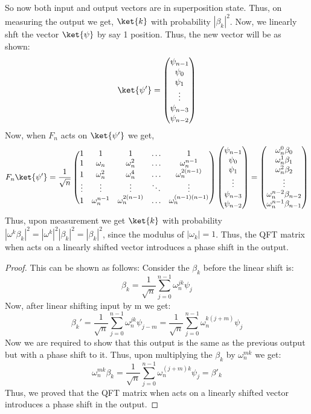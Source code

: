 \documentclass[12pt, oneside]{book}
\theoremstyle{definition}
\theoremstyle{definition}
\theoremstyle{remark}
\begin{document}
\begin{itemize}
        So now both input and output vectors are in superposition state. Thus, on measuring the output we get,
        $\ket{k}$ with probability $|\beta_k|^2$. Now, we linearly shft the vector $\ket{\psi}$ by say 1 position. Thus, the new vector will be as shown:
        \[ \ket{\psi'}=\begin{pmatrix} \psi_{n-1} \\ \psi_0 \\ \psi_1 \\ \vdots \\ \psi_{n-3} \\ \psi_{n-2} \end{pmatrix} \]
        Now, when $F_n$ acts on $\ket{\psi'}$ we get,
        \[ F_n\ket{\psi'}=\dfrac{1}{\sqrt{n}}\begin{pmatrix} 1 & 1 & 1 & \ldots & 1 \\ 1 & \omega_n & \omega_n^2 & \ldots & \omega_n^{n-1} \\ 1 & \omega_n^2 & \omega_n^4 & \ldots & \omega_n^{2(n-1)} \\ \vdots & \vdots & \vdots & \ddots & \vdots \\ 1 & \omega_n^{n-1} & \omega_n^{2(n-1)} & \ldots & \omega_n^{(n-1)(n-1)} \end{pmatrix}\begin{pmatrix} \psi_{n-1} \\ \psi_0 \\ \psi_1 \\ \vdots \\ \psi_{n-3} \\ \psi_{n-2} \end{pmatrix}=\begin{pmatrix} \omega_n^0 \beta_0 \\ \omega_n^1 \beta_1 \\ \omega_n^2 \beta_2 \\ \vdots \\ \omega_n^{n-2}\beta_{n-2} \\ \omega_n^{n-1} \beta_{n-1} \end{pmatrix} \]
        Thus, upon measurement we get $\ket{k}$ with probability $|\omega^k \beta_k|^2=|\omega^k|^2 |\beta_k|^2=|\beta_k|^2$, since the modulus of $|\omega_k|=1$. Thus, the QFT matrix when acts on a linearly shifted vector introduces a phase shift in the output.
    \begin{proof}
        This can be shown as follows: Consider the $\beta_k$ before the linear shift is:
        \[ \beta_k=\dfrac{1}{\sqrt{n}}\sum_{j=0}^{n-1}\omega_n^{jk}\psi_j \]
        Now, after linear shifting input by m we get:
        \[ \beta_k'=\dfrac{1}{\sqrt{n}}\sum_{j=0}^{n-1}\omega_n^{jk}\psi_{j-m} = \frac{1}{\sqrt{n}} \sum_{j=0}^{n-1}\omega_n^{k(j+m)} \psi_{j} \]
        Now we are required to show that this output is the same as the previous output but with a phase shift to it.
        Thus, upon multiplying the $\beta_k$ by $\omega_n^{mk}$ we get:
        \[ \omega_n^{mk}\beta_k=\dfrac{1}{\sqrt{n}}\sum_{j=0}^{n-1}\omega_n^{(j+m)k}\psi_j = \beta'_k \]
        Thus, we proved that the QFT matrix when acts on a linearly shifted vector introduces a phase shift in the output.
    \end{proof}


\end{itemize}
\end{document}
